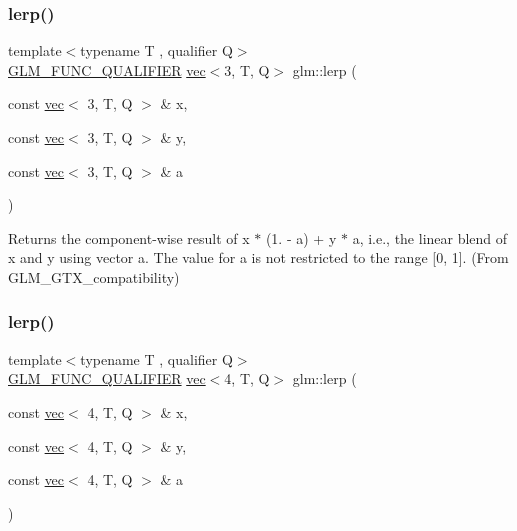 \subsubsection{\texorpdfstring{lerp()}{lerp()}\hspace{0.1cm}{\footnotesize\ttfamily [6/7]}}
{\footnotesize\ttfamily template$<$typename T , qualifier Q$>$ \\
\hyperlink{setup_8hpp_a33fdea6f91c5f834105f7415e2a64407}{G\+L\+M\+\_\+\+F\+U\+N\+C\+\_\+\+Q\+U\+A\+L\+I\+F\+I\+ER} \hyperlink{structglm_1_1vec}{vec}$<$3, T, Q$>$ glm\+::lerp (\begin{DoxyParamCaption}\item[{const \hyperlink{structglm_1_1vec}{vec}$<$ 3, T, Q $>$ \&}]{x,  }\item[{const \hyperlink{structglm_1_1vec}{vec}$<$ 3, T, Q $>$ \&}]{y,  }\item[{const \hyperlink{structglm_1_1vec}{vec}$<$ 3, T, Q $>$ \&}]{a }\end{DoxyParamCaption})}



Returns the component-\/wise result of x $\ast$ (1. -\/ a) + y $\ast$ a, i.\+e., the linear blend of x and y using vector a. The value for a is not restricted to the range \mbox{[}0, 1\mbox{]}. (From G\+L\+M\+\_\+\+G\+T\+X\+\_\+compatibility) 

\mbox{\label{group__gtx__compatibility_gab5477ab69c40de4db5d58d3359529724}} 
\subsubsection{\texorpdfstring{lerp()}{lerp()}\hspace{0.1cm}{\footnotesize\ttfamily [7/7]}}
{\footnotesize\ttfamily template$<$typename T , qualifier Q$>$ \\
\hyperlink{setup_8hpp_a33fdea6f91c5f834105f7415e2a64407}{G\+L\+M\+\_\+\+F\+U\+N\+C\+\_\+\+Q\+U\+A\+L\+I\+F\+I\+ER} \hyperlink{structglm_1_1vec}{vec}$<$4, T, Q$>$ glm\+::lerp (\begin{DoxyParamCaption}\item[{const \hyperlink{structglm_1_1vec}{vec}$<$ 4, T, Q $>$ \&}]{x,  }\item[{const \hyperlink{structglm_1_1vec}{vec}$<$ 4, T, Q $>$ \&}]{y,  }\item[{const \hyperlink{structglm_1_1vec}{vec}$<$ 4, T, Q $>$ \&}]{a }\end{DoxyParamCaption})}



